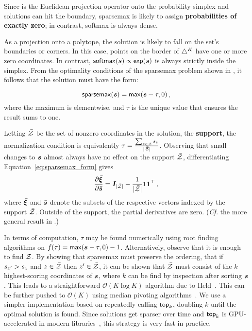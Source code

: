 Since
 is the Euclidean projection operator onto the probability
simplex and solutions can hit the boundary, sparsemax is likely to assign {\bf
        probabilities of exactly zero}; in contrast, softmax is always dense.

As a projection onto a polytope, the solution is likely to fall on the
set's boundaries or corners. In this case, points on the border of
$\simplex^K$ have one or more zero coordinates. In contrast, $\softmax(\s)
    \propto \exp(\s)$ is always strictly inside the simplex.
From the optimality conditions of the sparsemax problem shown in ,
it follows that the solution must have the form:

\begin{lemma}
    \begin{equation}\label{eq:sparsemax_form}
        \sparsemax(\s) = \max(\s - \tau, 0)\,,
    \end{equation}
    where the maximum is elementwise, and $\tau$ is the unique value that
    ensures the result sums to one.
\end{lemma}

Letting $\bar{\ZZ}$ be the set of
nonzero coordinates in the solution, \ie the \textbf{support}, the
normalization condition is equivalently $\tau = \frac{\sum_{z \in
            \bar{\ZZ}} \ss_z}{|\bar{\ZZ}|}$.
Observing that small changes to $\s$ almost always have no effect on the support
$\bar{\ZZ}$, differentiating Equation~\ref{eq:sparsemax_form} gives
\begin{equation}
    \pfrac{\bar{\pv}}{\bar{\s}} = \bm{I}_{|\bar{\ZZ}|} - \frac{1}{|\bar{\ZZ}|}
    \bm{11}^\top\,,
\end{equation}
where $\bar{\pv}$ and ${\bar{\s}}$ denote the subsets of the respective vectors
indexed by the support $\bar{\ZZ}$. Outside of the support, the partial
derivatives are zero. (\emph{Cf.} the more general result in \citet[Proposition
    2]{entmax}.)

In terms of computation, $\tau$ may be found numerically using root finding
algorithms on $f(\tau) = \max(\s - \tau, 0) - 1$.
Alternatively, observe that it is enough to find $\bar{\ZZ}$. By showing that
sparsemax must preserve the ordering, \ie that if $\ss_{z'} > \ss_z$ and $z \in
    \bar{\ZZ}$ then $z' \in \bar{\ZZ}$, it can be shown that $\bar{\ZZ}$ must
consist of the $k$ highest-scoring coordinates of $\s$, where $k$ can be find by
inspection after sorting $\s$. This leads to a straightforward $\mathcal{O}(K
    \log K)$ algorithm due to Held~\citep[pp.~16--17]{Held1974}. This can be further pushed to
$\mathcal{O}(K)$ using median pivoting algorithms~\citep{Condat2016, entmax}. We use
a simpler implementation based on repeatedly calling $\topk$,
doubling $k$ until the optimal solution is found. Since solutions get sparser
over time and $\topk$ is GPU-accelerated
in modern libraries~\citep{pytorch}, this strategy is very fast in practice.

